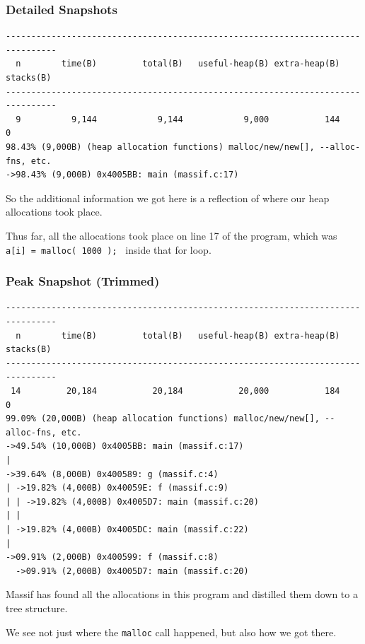 \begin{frame}[fragile]
\frametitle{Detailed Snapshots}

{\scriptsize
\begin{verbatim}
--------------------------------------------------------------------------------
  n        time(B)         total(B)   useful-heap(B) extra-heap(B)    stacks(B)
--------------------------------------------------------------------------------
  9          9,144            9,144            9,000           144            0
98.43% (9,000B) (heap allocation functions) malloc/new/new[], --alloc-fns, etc.
->98.43% (9,000B) 0x4005BB: main (massif.c:17)
\end{verbatim}
}

So the additional information we got here is a reflection of where our heap allocations took place. 

Thus far, all the allocations took place on line 17 of the program, which was \texttt{  a[i] = malloc( 1000 ); } inside that for loop.


\end{frame}


\begin{frame}[fragile]
\frametitle{Peak Snapshot (Trimmed)}


{\scriptsize
\begin{verbatim}
--------------------------------------------------------------------------------
  n        time(B)         total(B)   useful-heap(B) extra-heap(B)    stacks(B)
--------------------------------------------------------------------------------
 14         20,184           20,184           20,000           184            0
99.09% (20,000B) (heap allocation functions) malloc/new/new[], --alloc-fns, etc.
->49.54% (10,000B) 0x4005BB: main (massif.c:17)
| 
->39.64% (8,000B) 0x400589: g (massif.c:4)
| ->19.82% (4,000B) 0x40059E: f (massif.c:9)
| | ->19.82% (4,000B) 0x4005D7: main (massif.c:20)
| |   
| ->19.82% (4,000B) 0x4005DC: main (massif.c:22)
|   
->09.91% (2,000B) 0x400599: f (massif.c:8)
  ->09.91% (2,000B) 0x4005D7: main (massif.c:20)

\end{verbatim}
}

Massif has found all the allocations in this program and distilled them down to a tree structure.

We see not just where the \texttt{malloc} call happened, but also how we got there.


\end{frame}


